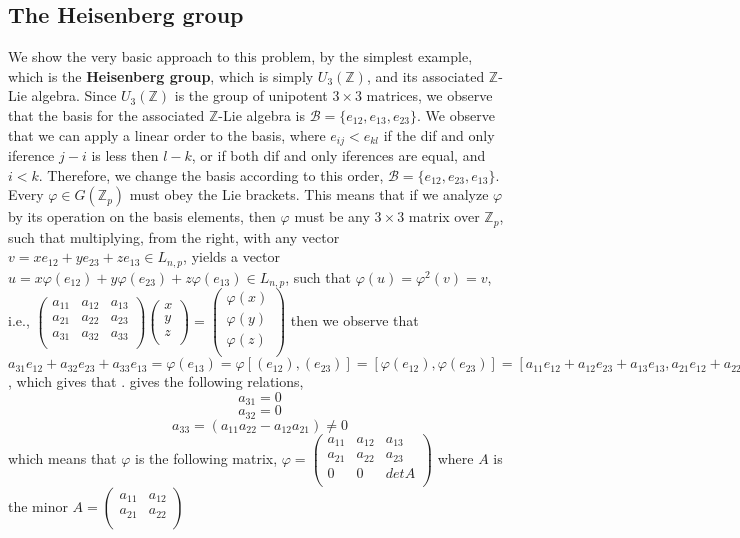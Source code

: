 \documentclass[12pt]{article}
\begin{document}
\subsection{The Heisenberg group}
We show the very basic approach to this problem, by the simplest example, which is the \textbf{Heisenberg group}, which is simply $U_3(\mathbb{Z})$, and its associated $\mathbb{Z}$-Lie algebra.
Since $U_3(\mathbb{Z})$ is the group of unipotent $3\times 3$ matrices, we observe that the basis for the associated $\mathbb{Z}$-Lie algebra is $\mathcal{B}=\{e_{12},e_{13},e_{23}\}$. We observe that we can apply a linear order to the basis, where $e_{ij}<e_{kl}$ if the dif and only iference $j-i$ is less then $l-k$, or if both dif and only iferences are equal, and $i<k$. Therefore, we change the basis according to this order, $\mathcal{B}=\{e_{12},e_{23},e_{13}\}$.
Every $\varphi\in G(\mathbb{Z}_p)$ must obey the Lie brackets. This means that if we analyze $\varphi$ by its operation on the basis elements, then $\varphi$ must be any $3\times 3$ matrix over $\mathbb{Z}_p$, such that multiplying, from the right, with any vector $v=xe_{12}+ye_{23}+ze_{13}\in L_{n,p}$, yields a vector $u=x\varphi(e_{12})+y\varphi(e_{23})+z\varphi(e_{13})\in L_{n,p}$, such that $\varphi(u)=\varphi^2(v)=v$, i.e., $\begin{pmatrix}
a_{11} & a_{12} & a_{13}\\
a_{21} & a_{22} & a_{23}\\
a_{31} & a_{32} & a_{33}\\
\end{pmatrix}\begin{pmatrix}
x \\ y \\ z\\
\end{pmatrix}=\begin{pmatrix}
\varphi(x) \\ \varphi(y) \\ \varphi(z)\\
\end{pmatrix}$
then we observe that $a_{31}e_{12}+a_{32}e_{23}+a_{33}e_{13}=\varphi(e_{13})=\varphi[(e_{12}),(e_{23})]=[\varphi(e_{12}),\varphi(e_{23})]=[a_{11}e_{12}+a_{12}e_{23}+a_{13}e_{13},a_{21}e_{12}+a_{22}e_{23}+a_{23}e_{13}]$, which gives that .
gives the following relations, $$
a_{31}=0$$
$$a_{32}=0$$
$$a_{33}=(a_{11}a_{22}-a_{12}a_{21})\neq 0
$$
which means that $\varphi$ is the following matrix, $\varphi=\begin{pmatrix}
a_{11} & a_{12} & a_{13}\\
a_{21} & a_{22} & a_{23}\\
0 & 0 & detA\\
\end{pmatrix}
$
where $A$ is the minor $
A=\begin{pmatrix}
a_{11} & a_{12}\\
a_{21} & a_{22}\\
\end{pmatrix}
$
\end{document}
